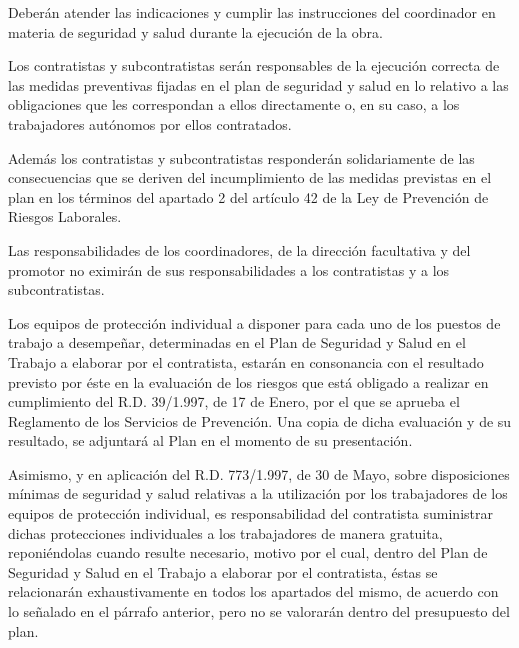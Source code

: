 Deberán atender las indicaciones y cumplir las instrucciones del coordinador en materia de seguridad y salud durante la ejecución de la obra.

Los contratistas y subcontratistas serán responsables de la ejecución correcta de las medidas preventivas fijadas en el plan de seguridad y salud en lo relativo a las obligaciones que les correspondan a ellos directamente o, en su caso, a los trabajadores autónomos por ellos contratados.

Además los contratistas y subcontratistas responderán solidariamente de las consecuencias que se deriven del incumplimiento de las medidas previstas en el plan en los términos del apartado 2 del artículo 42 de la Ley de Prevención de Riesgos Laborales.

Las responsabilidades de los coordinadores, de la dirección facultativa y del promotor no eximirán de sus responsabilidades a los contratistas y a los subcontratistas.

Los equipos de protección individual a disponer para cada uno de los puestos de trabajo a desempeñar, determinadas en el Plan de Seguridad y Salud en el Trabajo a elaborar por el contratista, estarán en consonancia con el resultado previsto por éste en la evaluación de los riesgos que está obligado a realizar en cumplimiento del R.D. 39/1.997, de 17 de Enero, por el que se aprueba el Reglamento de los Servicios de Prevención. Una copia de dicha evaluación y de su resultado, se adjuntará al Plan en el momento de su presentación.

Asimismo, y en aplicación del R.D. 773/1.997, de 30 de Mayo, sobre disposiciones mínimas de seguridad y salud relativas a la utilización por los trabajadores de los equipos de protección individual, es responsabilidad del contratista suministrar dichas protecciones individuales a los trabajadores de manera gratuita, reponiéndolas cuando resulte necesario, motivo por el cual, dentro del Plan de Seguridad y Salud en el Trabajo a elaborar por el contratista, éstas se relacionarán exhaustivamente en todos los apartados del mismo, de acuerdo con lo señalado en el párrafo anterior, pero no se valorarán dentro del presupuesto del plan.
